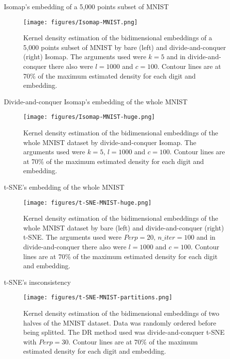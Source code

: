 \documentclass[10pt]{beamer}
\begin{document}
\begin{frame}{Isomap's embedding of a 5,000 points subset of MNIST}
    \begin{figure}
        \centering
        \texttt{[image: figures/Isomap-MNIST.png]}
    \caption{Kernel density estimation of the bidimensional embeddings of a 5,000 points subset of MNIST by bare (left) and divide-and-conquer (right) Isomap. The arguments used were $k=5$ and in divide-and-conquer there also were $l=1000$ and $c=100$. Contour lines are at 70\% of the maximum estimated density for each digit and embedding.}
        \label{fig:Isomap-MNIST-kde}
    \end{figure}
\end{frame}
\begin{frame}{Divide-and-conquer Isomap's embedding of the whole MNIST}
    \begin{figure}
        \centering
        \texttt{[image: figures/Isomap-MNIST-huge.png]}
    \caption{Kernel density estimation of the bidimensional embeddings of the whole MNIST dataset by divide-and-conquer Isomap. The arguments used were $k=5, \, l=1000$ and $c=100$. Contour lines are at 70\% of the maximum estimated density for each digit and embedding.}
        \label{fig:Isomap-MNIST-huge}
    \end{figure}
\end{frame}

\begin{frame}{t-SNE's embedding of the whole MNIST}
    \begin{figure}
        \centering
        \texttt{[image: figures/t-SNE-MNIST-huge.png]}
    \caption{Kernel density estimation of the bidimensional embeddings of the whole MNIST dataset by bare (left) and divide-and-conquer (right) t-SNE. The arguments used were $Perp=20, \, n\_iter=100$ and in divide-and-conquer there also were $l=1000$ and $c=100$. Contour lines are at 70\% of the maximum estimated density for each digit and embedding.}
        \label{fig:t-SNE-MNIST-huge}
    \end{figure}
\end{frame}

\begin{frame}{t-SNE's insconsistency}
    \begin{figure}
        \centering
        \texttt{[image: figures/t-SNE-MNIST-partitions.png]}
    \caption{Kernel density estimation of the bidimensional embeddings of two halves of the MNIST dataset. Data was randomly ordered before being splitted. The DR method used was divide-and-conquer t-SNE with $Perp=30$. Contour lines are at 70\% of the maximum estimated density for each digit and embedding.}
        \label{fig:t-SNE-MNIST-partitions}
    \end{figure}
\end{frame}
\end{document}
